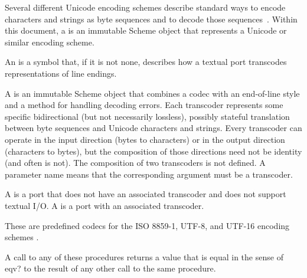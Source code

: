 Several different Unicode encoding schemes describe standard ways to
encode characters and strings as byte sequences and to decode those
sequences~\cite{Unicode}.
Within this document, a  is an immutable Scheme
object that represents a Unicode or similar encoding scheme.

An  is a symbol that, if it is not {\cf
  none}, describes how a textual port transcodes representations of
line endings.

A  is an immutable Scheme object that combines
a codec with an end-of-line style and a method for handling
decoding errors.
Each transcoder represents some specific bidirectional (but not
necessarily lossless), possibly stateful translation between byte
sequences and Unicode characters and strings.
Every transcoder can operate in the input direction (bytes to characters)
or in the output direction (characters to bytes),
but the composition of those directions need not be identity (and
often is not).  The composition of two transcoders is not defined.
A  parameter name means that the corresponding
argument must be a transcoder.

A  is a port that does not have an associated
transcoder and does not support textual I/O.  A  is a port with an associated transcoder.

\begin{entry}{%
}

These are predefined codecs for the ISO 8859-1, UTF-8,
and UTF-16 encoding schemes \cite{Unicode}.

A call to any of these procedures returns a value that is equal in the
sense of {\cf eqv?} to the result of any other call to the same
procedure.
\end{entry}

